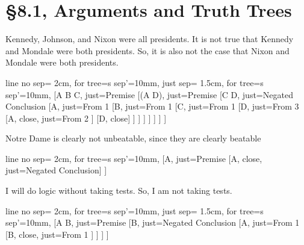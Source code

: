 % 
% 

\section{\S 8.1, Arguments and Truth Trees}
\begin{enumerate}

\begin{statement}{Kennedy, Johnson, and Nixon were all presidents. It is not true that Kennedy
and Mondale were both presidents. So, it is also not the case that Nixon
and Mondale were both presidents.}
\end{statement}

\begin{tableau}
{ line no sep= 2cm, for tree={s sep'=10mm}, just sep= 1.5cm, for tree={s sep'=10mm}, }
[A \land B \land C,                  just={Premise}
    [\neg (A \land D),               just={Premise}
        [C \land D,                  just={Negated Conclusion}
            [A,                      just={From 1}
                [B,                  just={From 1}
                    [C,              just={From 1}
                        [D,          just={From 3}
                            [\neg A, close, just={From 2} ]
                            [\neg D, close]
                        ]
                    ]
                ]
            ]
        ]
    ]
]
\end{tableau}


\begin{statement}{Notre Dame is clearly not unbeatable, since they are clearly beatable}
\end{statement}
\begin{tableau}
{
line no sep= 2cm,
for tree={s sep'=10mm},
}
[A, just={Premise}
    [\neg A, close, just={Negated Conclusion}]
]
\end{tableau}


\begin{statement}{I will do logic without taking tests. So, I am not taking tests.}
\end{statement}
\begin{tableau}
{ line no sep= 2cm, for tree={s sep'=10mm}, just sep= 1.5cm, for tree={s sep'=10mm}, }
[A \land \neg B,             just={Premise}
    [B,                      just={Negated Conclusion}
        [A,                  just={From 1}
            [\neg B, close, just={From 1} ]
        ]
    ]
]
\end{tableau}

\end{enumerate}
% 
